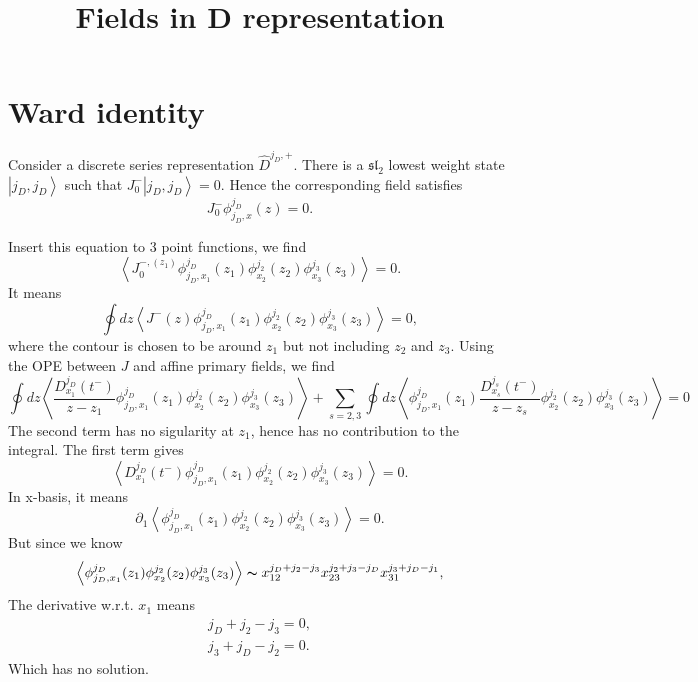 \documentclass[10pt,a4paper]{article}
\numberwithin{equation}{section}
\newcommand{\ket}[1]{\left| #1 \right\rangle}
\newcommand{\vev}[1]{\left< #1 \right>}
\begin{document}
\title{Fields in D representation}
\maketitle

\section{Ward identity}
Consider a discrete series representation $\hat{D}^{j_{D},+}$. There is a $\mathfrak{sl}_{2}$ lowest weight state $\ket{j_{D},j_{D}}$ such that 
$J^{-}_{0} \ket{j_{D},j_{D}} = 0$. Hence the corresponding field satisfies 
\begin{equation}
    J^{-}_{0} \phi^{j_{D}}_{j_{D},x}(z) = 0. \label{eq1}
\end{equation}

Insert this equation to 3 point functions, we find 
\begin{equation}
    \vev{J^{-,(z_{1})}_{0} \phi^{j_{D}}_{j_{D},x_{1}}(z_{1}) \phi^{j_{2}}_{x_{2}}(z_{2}) \phi^{j_{3}}_{x_{3}}(z_{3})} = 0.
\end{equation}
It means 
\begin{equation}
    \oint dz \vev{J^{-}(z) \phi^{j_{D}}_{j_{D},x_{1}}(z_{1}) \phi^{j_{2}}_{x_{2}}(z_{2}) \phi^{j_{3}}_{x_{3}}(z_{3})} = 0,
\end{equation}
where the contour is chosen to be around $z_{1}$ but not including $z_{2}$ and $z_{3}$. Using the OPE between $J$ and affine primary
fields, we find 
\begin{equation}
    \oint dz \vev{\frac{D^{j_{D}}_{x_{1}}(t^{-})}{z-z_{1}} \phi^{j_{D}}_{j_{D},x_{1}}(z_{1}) \phi^{j_{2}}_{x_{2}}(z_{2}) \phi^{j_{3}}_{x_{3}}(z_{3})} +
    \sum_{s=2,3} \oint dz \vev{ \phi^{j_{D}}_{j_{D},x_{1}}(z_{1}) \frac{D^{j_{s}}_{x_{s}}(t^{-})}{z-z_{s}} \phi^{j_{2}}_{x_{2}}(z_{2}) \phi^{j_{3}}_{x_{3}}(z_{3})} = 0
\end{equation}
The second term has no sigularity at $z_{1}$, hence has no contribution to the integral. The first term gives 
\begin{equation}
    \vev{D^{j_{D}}_{x_{1}}(t^{-}) \phi^{j_{D}}_{j_{D},x_{1}}(z_{1}) \phi^{j_{2}}_{x_{2}}(z_{2}) \phi^{j_{3}}_{x_{3}}(z_{3})} = 0.
\end{equation}
In x-basis, it means 
\begin{equation}
    \partial_{1}\vev{ \phi^{j_{D}}_{j_{D},x_{1}}(z_{1}) \phi^{j_{2}}_{x_{2}}(z_{2}) \phi^{j_{3}}_{x_{3}}(z_{3})} = 0.
\end{equation}
But since we know 
\begin{equation}
    \vev{ \phi^{j_{D}}_{j_{D},x_{1}}(z_{1}) \phi^{j_{2}}_{x_{2}}(z_{2}) \phi^{j_{3}}_{x_{3}}(z_{3})} \thicksim  x_{12}^{j_{D} + j_{2}-j_{3}}x_{23}^{j_{2}+j_{3} - j_{D}} x_{31}^{j_{3} + j_{D}-j_{1}},
\end{equation}
The derivative w.r.t. $x_{1}$ means
\begin{align}
    j_{D} + j_{2}-j_{3} = 0, \\
    j_{3} + j_{D}-j_{2} = 0.
\end{align}
Which has no solution.\\
\end{document}
